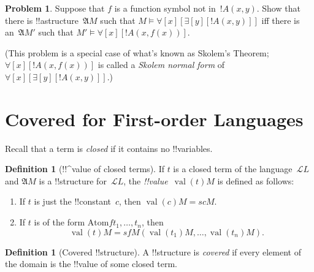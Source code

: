\documentclass[10pt,a4paper]{article}
\theoremstyle{plain}
\theoremstyle{definition}
\newtheorem{defn}[thm]{Definition}
\newtheorem{prob}{Problem}[section]
\theoremstyle{remark}
\newenvironment{explain}{}{}
\newcommand*{\olfileid}[3]{}
\newcommand*{\olsection}[1]{\section*{#1}}
\providecommand{\lforall}{\mathord{\forall}}
\providecommand{\lexists}{\mathord{\exists}}
\providecommand{\Struct}{\ensuremath{\mathfrak{A}}}
\providecommand{\Assign}{\ensuremath{s}}
\providecommand{\Sat}[2]{\ensuremath{#1 \models #2}}
\providecommand{\Lang}{\ensuremath{\mathcal{L}}}
\providecommand{\Value}[1]{\operatorname{val}(#1)}
\providecommand{\Atom}{\mathrm{Atom}}
\begin{document}
\begin{prob}
Suppose that $f$ is a function symbol not in~$!A(x,y)$. Show that
there is !!a{structure}~$\Struct{M}$ such that
$\Sat{M}{\lforall[x][\lexists[y][!A(x,y)]]}$ iff there is an~$\Struct
M'$ such that $\Sat{M'}{\lforall[x][!A(x,f(x))]}$.

(This problem is a special case of what's known as Skolem's Theorem;
$\lforall[x][!A(x,f(x))]$ is called a \emph{Skolem normal form} of
$\lforall[x][\lexists[y][!A(x,y)]]$.)
\end{prob}





\olfileid{fol}{syn}{cov}

\olsection{Covered  for First-order Languages}

\begin{explain}
Recall that a term is \emph{closed} if it contains no !!{variable}s.
\end{explain}

\begin{defn}[!!^{value} of closed terms]
If $t$ is a closed term of the language~$\Lang L$ and $\Struct M$ is a
!!{structure} for~$\Lang L$, the \emph{!!{value}}~$\Value{t}{M}$ is
defined as follows:
\begin{enumerate}
\item If $t$ is just the !!{constant}~$c$, then $\Value{c}{M} = \Assign{c}{M}$.
\item If $t$ is of the form $\Atom{f}{t_1, \ldots, t_n}$, then
  \[
  \Value{t}{M} = \Assign{f}{M}(\Value{t_1}{M}, \ldots,
  \Value{t_n}{M}).
  \]
\end{enumerate}
\end{defn}

\begin{defn}[Covered !!{structure}]
A !!{structure} is \emph{covered} if every element of the domain is the
!!{value} of some closed term.
\end{defn}
\end{document}
